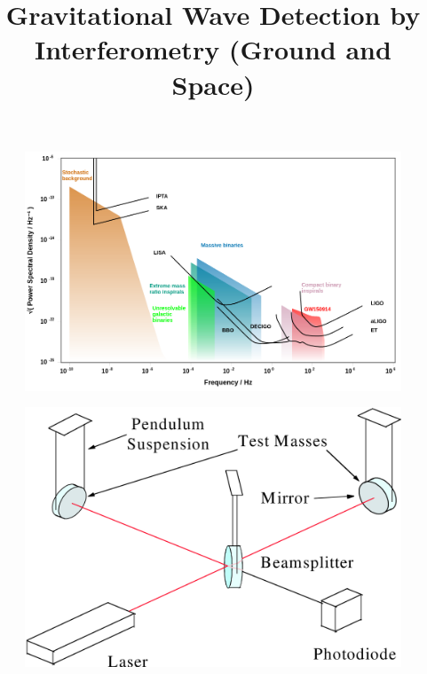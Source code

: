 






\title{Gravitational Wave Detection by Interferometry (Ground and Space)
}

\begin{abstract}\end{abstract}



\begin{figure}[]
\begin{center}
\includegraphics[width=1\columnwidth]{./figures/fig1/fig1}
\caption{ \protect}
\end{center}
\end{figure}




\begin{figure}[]
\begin{center}
\includegraphics[width=1\columnwidth]{./figures/fig2/fig2}
\caption{ \protect}
\end{center}
\end{figure}


